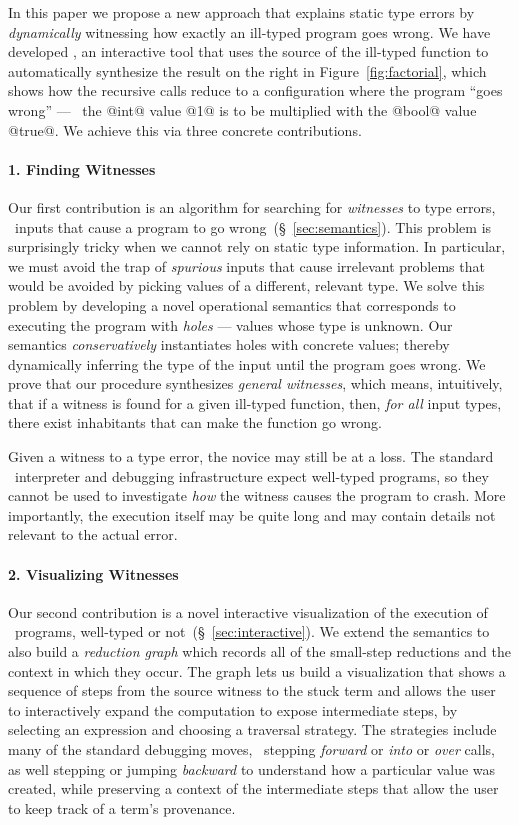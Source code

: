 In this paper we propose a new approach that explains 
static type errors by \emph{dynamically} witnessing
how exactly an ill-typed program goes wrong.
%
We have developed \toolname, an interactive tool that uses
the source of the ill-typed function to automatically synthesize
the result on the right in Figure~\ref{fig:factorial}, which
shows how the recursive calls reduce to a configuration where
the program ``goes wrong'' --- \ie\ the @int@ value @1@ is to be
multiplied with the @bool@ value @true@.
We achieve this via three concrete contributions.

\paragraph{1. Finding Witnesses}
Our first contribution is an algorithm for searching for
\emph{witnesses} to type errors, \ie\ inputs that cause a
program to go wrong~(\S~\ref{sec:semantics}).
%
This problem is surprisingly tricky when we cannot rely on
static type information.
%
In particular, we must avoid the trap of \emph{spurious} inputs
that cause irrelevant problems that would be avoided by picking
values of a different, relevant type.
%
We solve this problem by developing a novel operational semantics
that corresponds to executing the program with \emph{holes} ---
values whose type is unknown.
%
Our semantics \emph{conservatively} instantiates holes with concrete
values; thereby dynamically inferring the type of the input
until the program goes wrong.
%
We prove that our procedure synthesizes \emph{general witnesses},
which means, intuitively, that if a witness is found for a given
ill-typed function, then, \emph{for all} input types, there exist
inhabitants that can make the function go wrong.

Given a witness to a type error, the novice may still be at a loss.
%
The standard \ocaml\ interpreter and debugging infrastructure expect
well-typed programs, so they cannot be used to investigate \emph{how}
the witness causes the program to crash.
%
More importantly, the execution itself may be quite long and may contain
details not relevant to the actual error.

\paragraph{2. Visualizing Witnesses}
Our second contribution is a novel interactive visualization of the
execution of \ocaml\ programs, well-typed or not~(\S~\ref{sec:interactive}).
%
We extend the semantics to also build a \emph{reduction graph}
which records all of the small-step reductions and the context
in which they occur.
%
The graph lets us build a visualization that shows a sequence of
steps from the source witness to the stuck term and allows the user
to interactively expand the computation to expose intermediate steps,
by selecting an expression and choosing a traversal strategy.
%
The strategies include many of the standard debugging moves, \eg\
stepping \emph{forward} or \emph{into} or \emph{over} calls, as well
stepping or jumping \emph{backward} to understand how a particular
value was created, while preserving a context of the intermediate
steps that allow the user to keep track of a term's provenance.

